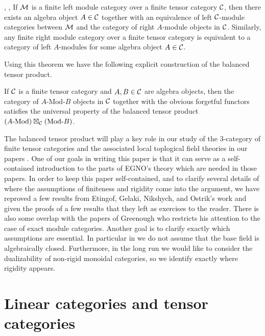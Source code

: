 \documentclass{amsart}
\begin{document}
\begin{maintheorem}{\cite[Thm 2.11.6]{EGNO}, \cite[\S 3.2]{EO-ftc}, \cite[Thm 1]{MR1976459}} %
	If $\mathcal M$ is a finite left module category over a finite tensor category $\mathcal C$, then there exists an algebra object $A \in \mathcal C$ together with an equivalence of left $\mathcal C$-module categories between $\mathcal M$ and the category of right $A$-module objects in $\mathcal C$.  Similarly, any finite right module category over a finite tensor category is equivalent to a category of left $A$-modules for some algebra object $A \in \mathcal C$.
\end{maintheorem}

Using this theorem we have the following explicit construction of the balanced tensor product.

\begin{maintheorem}
If $\mathcal C$ is a finite tensor category and $A, B \in \mathcal C$ are algebra objects, then the category of $A\text{-Mod-}B$ objects in $\mathcal C$ together with the obvious forgetful functors satisfies the universal property of the balanced tensor product $(A\text{-Mod}) \boxtimes_\mathcal C (\text{Mod-}B)$.
\end{maintheorem}

The balanced tensor product will play a key role in our study of the $3$-category of finite tensor categories and the associated local toplogical field theories in our papers \cite{3TC, DTCI}.  One of our goals in writing this paper is that it can serve as a self-contained introduction to the parts of EGNO's theory which are needed in those papers.  In order to keep this paper self-contained, and to clarify several details of where the assumptions of finiteness and rigidity come into the argument, we have reproved a few results from Etingof, Gelaki, Nikshych, and Ostrik's work and given the proofs of a few results that they left as exercises to the reader.  There is also some overlap with the papers of Greenough \cite{MR2678824, 1102.3411} who restricts his attention to the case of exact module categories.  Another goal is to clarify exactly which assumptions are essential.  In particular in \cite{3TC, DTCI} we do not assume that the base field is algebraically closed.  Furthermore, in the long run we would like to consider the dualizability of non-rigid monoidal categories, so we identify exactly where rigidity appears.


\section{Linear categories and tensor categories} \label{sec:tc-lincat}
\end{document}
